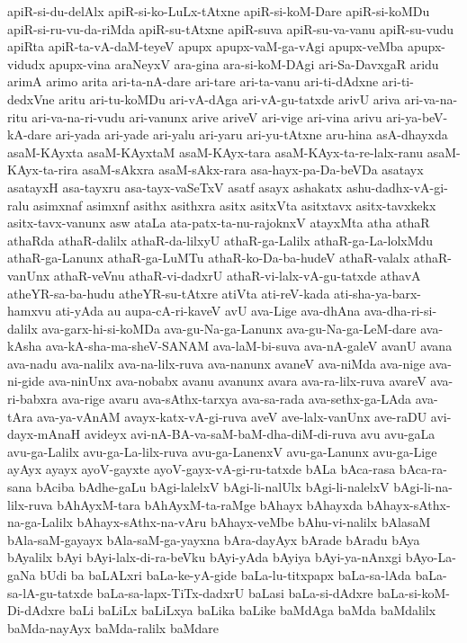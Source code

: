 {apiR-si-du-delAlx
apiR-si-ko-LuLx-tAtxne
apiR-si-koM-Dare
apiR-si-koMDu
apiR-si-ru-vu-da-riMda
apiR-su-tAtxne
apiR-suva
apiR-su-va-vanu
apiR-su-vudu
apiRta
apiR-ta-vA-daM-teyeV
apupx
apupx-vaM-ga-vAgi
apupx-veMba
apupx-vidudx
apupx-vina
araNeyxV
ara-gina
ara-si-koM-DAgi
ari-Sa-DavxgaR
aridu
arimA
arimo
arita
ari-ta-nA-dare
ari-tare
ari-ta-vanu
ari-ti-dAdxne
ari-ti-dedxVne
aritu
ari-tu-koMDu
ari-vA-dAga
ari-vA-gu-tatxde
arivU
ariva
ari-va-na-ritu
ari-va-na-ri-vudu
ari-vanunx
arive
ariveV
ari-vige
ari-vina
arivu
ari-ya-beV-kA-dare
ari-yada
ari-yade
ari-yalu
ari-yaru
ari-yu-tAtxne
aru-hina
asA-dhayxda
asaM-KAyxta
asaM-KAyxtaM
asaM-KAyx-tara
asaM-KAyx-ta-re-lalx-ranu
asaM-KAyx-ta-rira
asaM-sAkxra
asaM-sAkx-rara
asa-hayx-pa-Da-beVDa
asatayx
asatayxH
asa-tayxru
asa-tayx-vaSeTxV
asatf
asayx
ashakatx
ashu-dadhx-vA-gi-ralu
asimxnaf
asimxnf
asithx
asithxra
asitx
asitxVta
asitxtavx
asitx-tavxkekx
asitx-tavx-vanunx
asw
ataLa
ata-patx-ta-nu-rajoknxV
atayxMta
atha
athaR
athaRda
athaR-dalilx
athaR-da-lilxyU
athaR-ga-Lalilx
athaR-ga-La-lolxMdu
athaR-ga-Lanunx
athaR-ga-LuMTu
athaR-ko-Da-ba-hudeV
athaR-valalx
athaR-vanUnx
athaR-veVnu
athaR-vi-dadxrU
athaR-vi-lalx-vA-gu-tatxde
athavA
atheYR-sa-ba-hudu
atheYR-su-tAtxre
atiVta
ati-reV-kada
ati-sha-ya-barx-hamxvu
ati-yAda
au
aupa-cA-ri-kaveV
avU
ava-Lige
ava-dhAna
ava-dha-ri-si-dalilx
ava-garx-hi-si-koMDa
ava-gu-Na-ga-Lanunx
ava-gu-Na-ga-LeM-dare
ava-kAsha
ava-kA-sha-ma-sheV-SANAM
ava-laM-bi-suva
ava-nA-galeV
avanU
avana
ava-nadu
ava-nalilx
ava-na-lilx-ruva
ava-nanunx
avaneV
ava-niMda
ava-nige
ava-ni-gide
ava-ninUnx
ava-nobabx
avanu
avanunx
avara
ava-ra-lilx-ruva
avareV
ava-ri-babxra
ava-rige
avaru
ava-sAthx-tarxya
ava-sa-rada
ava-sethx-ga-LAda
ava-tAra
ava-ya-vAnAM
avayx-katx-vA-gi-ruva
aveV
ave-lalx-vanUnx
ave-raDU
avi-dayx-mAnaH
avideyx
avi-nA-BA-va-saM-baM-dha-diM-di-ruva
avu
avu-gaLa
avu-ga-Lalilx
avu-ga-La-lilx-ruva
avu-ga-LanenxV
avu-ga-Lanunx
avu-ga-Lige
ayAyx
ayayx
ayoV-gayxte
ayoV-gayx-vA-gi-ru-tatxde
bALa
bAca-rasa
bAca-ra-sana
bAciba
bAdhe-gaLu
bAgi-lalelxV
bAgi-li-nalUlx
bAgi-li-nalelxV
bAgi-li-na-lilx-ruva
bAhAyxM-tara
bAhAyxM-ta-raMge
bAhayx
bAhayxda
bAhayx-sAthx-na-ga-Lalilx
bAhayx-sAthx-na-vAru
bAhayx-veMbe
bAhu-vi-nalilx
bAlasaM
bAla-saM-gayayx
bAla-saM-ga-yayxna
bAra-dayAyx
bArade
bAradu
bAya
bAyalilx
bAyi
bAyi-lalx-di-ra-beVku
bAyi-yAda
bAyiya
bAyi-ya-nAnxgi
bAyo-La-gaNa
bUdi
ba
baLALxri
baLa-ke-yA-gide
baLa-lu-titxpapx
baLa-sa-lAda
baLa-sa-lA-gu-tatxde
baLa-sa-lapx-TiTx-dadxrU
baLasi
baLa-si-dAdxre
baLa-si-koM-Di-dAdxre
baLi
baLiLx
baLiLxya
baLika
baLike
baMdAga
baMda
baMdalilx
baMda-nayAyx
baMda-ralilx
baMdare
}
